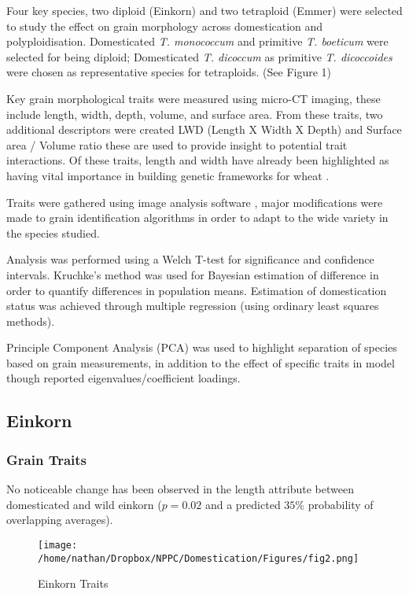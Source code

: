 \documentclass[a4paper, twocolumn]{article}
\begin{document}
Four key species, two diploid (Einkorn) and two tetraploid (Emmer) were selected to study the effect on grain morphology across domestication and polyploidisation. Domesticated  \emph{T. monococcum} and primitive \emph{T. boeticum} were selected for being diploid; Domesticated \emph{T. dicoccum} as primitive \emph{T. dicoccoides} were chosen as representative species for tetraploids. (See Figure 1)

Key grain morphological traits were measured using micro-CT imaging, these include length, width, depth, volume, and surface area. From these traits, two additional descriptors were created LWD (Length X Width X Depth) and Surface area / Volume ratio these are used to provide insight to potential trait interactions. Of these traits, length and width have already been highlighted as having vital importance in building genetic frameworks for wheat \cite{Gegas2010}.

Traits were gathered using image analysis software \cite{Hughes2017}, major modifications were made to grain identification algorithms in order to adapt to the wide variety in the species studied.

Analysis was performed using a Welch T-test for significance and confidence intervals. Kruchke's method was used for Bayesian estimation of difference \cite{Kruschke2012} in order to quantify differences in population means. Estimation of domestication status was achieved through multiple regression (using ordinary least squares methods).

Principle Component Analysis (PCA) was used to highlight separation of species based on grain measurements, in addition to the effect of specific traits in model though reported eigenvalues/coefficient loadings.

\subsection{Einkorn}
\label{sec:orgdb48674}

\subsubsection{Grain Traits}
\label{sec:org95473f6}
No noticeable change has been observed in the length attribute between domesticated and wild einkorn (\(p=0.02\) and a predicted \(35\%\) probability of overlapping averages).

\begin{figure}[htbp]
\centering
\texttt{[image: /home/nathan/Dropbox/NPPC/Domestication/Figures/fig2.png]}
\caption{\label{fig:orgec63b81}
Einkorn Traits}
\end{figure}
\end{document}
